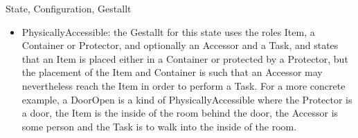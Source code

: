 \begin{ODP}{State, Configuration, Gestallt}
\begin{itemize}
  \item PhysicallyAccessible: the Gestallt for this state uses the roles Item, a Container or Protector, and optionally an Accessor and a Task, and states that an Item is placed either in a Container or protected by a Protector, but the placement of the Item and Container is such that an Accessor may nevertheless reach the Item in order to perform a Task. For a more concrete example, a DoorOpen is a kind of PhysicallyAccessible where the Protector is a door, the Item is the inside of the room behind the door, the Accessor is some person and the Task is to walk into the inside of the room.
\end{itemize}
\end{ODP}




